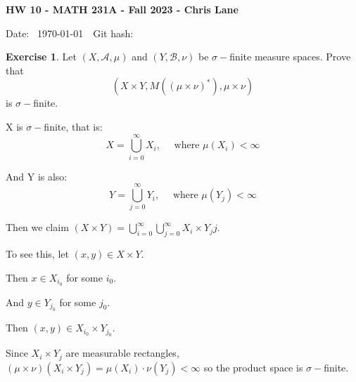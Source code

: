 \documentclass[11pt,oneside]{article}
\numberwithin{equation}{section}
\theoremstyle{definition}
\newtheorem{exercise}{Exercise}
\def\fancyA{\mathscr{A}}
\def\fancyB{\mathscr{B}}
\begin{document}
\textbf{HW 10 - MATH 231A - Fall 2023 - Chris Lane}

Date: \hhmmsstime{} \ \today \ \ Git hash: 
 

\begin{exercise}
  Let $(X, \fancyA, \mu)$ and $(Y, \fancyB, \nu)$ be $\sigma-$finite
  measure spaces.  Prove that
  \[
  ( X \times Y, M((\mu \times \nu)^*), \mu \times \nu)
  \]
  is $\sigma-$finite.
\end{exercise} 
\begin{solution}
  X is $\sigma-$finite, that is:
  \[
  X = \bigcup \limits _ {i=0}^{\infty} X_i, \quad \textrm{ where } \mu(X_i) < \infty
  \]

  And Y is also:
  \[
  Y = \bigcup \limits _{j=0}^{\infty} Y_i, \quad \textrm{ where } \mu(Y_j) < \infty
  \]

  Then we claim $(X \times Y) = \bigcup _ {i=0} ^ \infty \bigcup _{j=0}^\infty X_i \times Y_jj$.

  To see this, let $(x, y) \in X \times Y$.

  Then $x \in X_{i_0}$ for some $i_0 $.

  And  $y \in Y_{j_0}$ for some $j_0 $.

  Then $(x, y) \in X_{i_0} \times Y_{j_0}$.

  Since $X_i \times Y_j$ are measurable rectangles, $(\mu \times
  \nu)(X_i \times Y_j) = \mu(X_i) \cdot \nu(Y_j) < \infty$ so the product space
  is $\sigma-$finite.
  
\end{solution}
\end{document}
